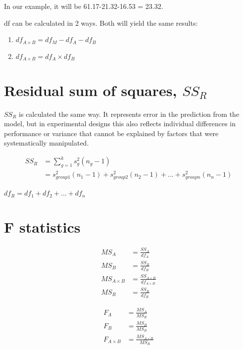 \documentclass[a4paper, 12pt]{book}
\begin{document}
In our example, it will be 61.17-21.32-16.53 = 23.32.

df can be calculated in 2 ways. Both will yield the same results:
\begin{enumerate}
\item $df_{A \times B} = df_M - df_A - df_B$
\item $df_{A \times B} = df_A \times df_B$
\end{enumerate}

\section{Residual sum of squares, $SS_R$}
$SS_R$ is calculated the same way. It represents error in the prediction from the model, but in experimental designs this also reflects individual differences in performance or variance that cannot be explained by factors that were systematically manipulated.

\begin{equation}
\begin{split}
SS_R & = \sum^k_{g=1} s^2_g (n_g - 1) \\
& = s^2_{group1}(n_1-1) + s^2_{group2}(n_2-1) + ... + s^2_{groupn}(n_n-1)
\end{split}
\end{equation}

$df_R = df_1 + df_2 + ... + df_n$

\section{F statistics}
\begin{equation}
\begin{split}
MS_A &= \frac{SS_A}{df_A}\\
MS_B &= \frac{SS_B}{df_B}\\
MS_{A \times B} &= \frac{SS_{A \times B}}{df_{A \times B}}\\
MS_R &= \frac{SS_R}{df_R}
\end{split}
\end{equation}

\begin{equation}
\begin{split}
F_A &= \frac{MS_A}{MS_R}\\
F_B &= \frac{MS_B}{MS_R}\\
F_{A \times B} &= \frac{MS_{A \times B}}{MS_R}\\
\end{split}
\end{equation}
\end{document}
